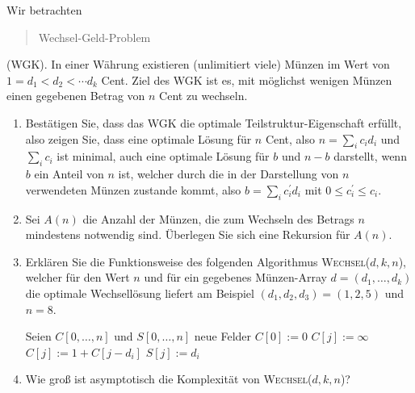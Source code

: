 
\begin{exercise}

Wir betrachten \blockquote{Wechsel-Geld-Problem} (WGK).
In einer Währung existieren (unlimitiert viele) Münzen im Wert von $1 = d_1 < d_2 < \cdots  d_k$ Cent.
Ziel des WGK ist es, mit möglichst wenigen Münzen einen gegebenen Betrag von $n$ Cent zu wechseln.

\begin{enumerate}[label = \alph*]

  \item Bestätigen Sie, dass das WGK die optimale Teilstruktur-Eigenschaft erfüllt, also zeigen Sie, dass eine optimale Lösung für $n$ Cent, also $n = \sum_{i} c_i d_i$ und $\sum_i c_i$ ist minimal, auch eine optimale Lösung für $b$ und $n - b$ darstellt, wenn $b$ ein Anteil von $n$ ist, welcher durch die in der Darstellung von $n$ verwendeten Münzen zustande kommt, also $b = \sum_i c_i^\prime d_i$ mit $0 \leq c_i^\prime \leq c_i$.

  \item Sei $A(n)$ die Anzahl der Münzen, die zum Wechseln des Betrags $n$ mindestens notwendig sind.
  Überlegen Sie sich eine Rekursion für $A(n)$.

  \item Erklären Sie die Funktionsweise des folgenden Algorithmus \textsc{Wechsel}($d, k, n$), welcher für den Wert $n$ und für ein gegebenes Münzen-Array $d = (d_1, \dots, d_k)$ die optimale Wechsellösung liefert am Beispiel $(d_1, d_2, d_3) = (1, 2, 5)$ und $n = 8$.
  
  \phantom{}

  \begin{algorithmic}
      \State Seien $C[0, \dots, n]$ und $S[0, \dots, n]$ neue Felder
      \State $C[0] := 0$
        \State $C[j] := \infty$
            \State $C[j] := 1 + C[j - d_i]$
            \State $S[j] := d_i$
          \EndIf
        \EndFor
      \EndFor
    \EndProcedure
  \end{algorithmic}

  \phantom{}

  \item Wie groß ist asymptotisch die Komplexität von \textsc{Wechsel}($d, k, n$)?

\end{enumerate}


\end{exercise}

